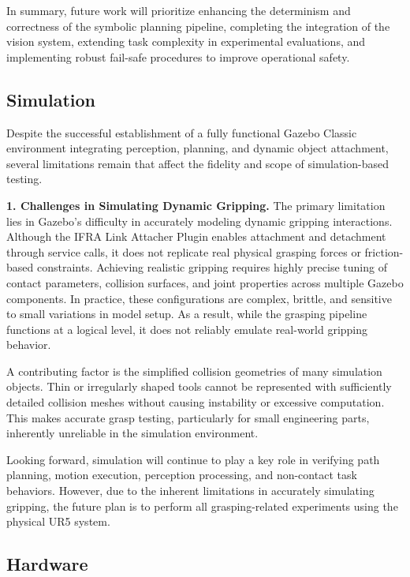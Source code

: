 \documentclass[12pt]{extarticle}
\begin{document}
In summary, future work will prioritize enhancing the determinism and correctness of the symbolic planning pipeline, completing the integration of the vision system, extending task complexity in experimental evaluations, and implementing robust fail-safe procedures to improve operational safety.

\subsection{Simulation}

Despite the successful establishment of a fully functional Gazebo Classic environment integrating perception, planning, and dynamic object attachment, several limitations remain that affect the fidelity and scope of simulation-based testing.

\textbf{1. Challenges in Simulating Dynamic Gripping.}
The primary limitation lies in Gazebo’s difficulty in accurately modeling dynamic gripping interactions. Although the IFRA Link Attacher Plugin enables attachment and detachment through service calls, it does not replicate real physical grasping forces or friction-based constraints. Achieving realistic gripping requires highly precise tuning of contact parameters, collision surfaces, and joint properties across multiple Gazebo components. In practice, these configurations are complex, brittle, and sensitive to small variations in model setup. As a result, while the grasping pipeline functions at a logical level, it does not reliably emulate real-world gripping behavior.

A contributing factor is the simplified collision geometries of many simulation objects. Thin or irregularly shaped tools cannot be represented with sufficiently detailed collision meshes without causing instability or excessive computation. This makes accurate grasp testing, particularly for small engineering parts, inherently unreliable in the simulation environment.

Looking forward, simulation will continue to play a key role in verifying path planning, motion execution, perception processing, and non-contact task behaviors. However, due to the inherent limitations in accurately simulating gripping, the future plan is to perform all grasping-related experiments using the physical UR5 system. 

\subsection{Hardware}
\end{document}
